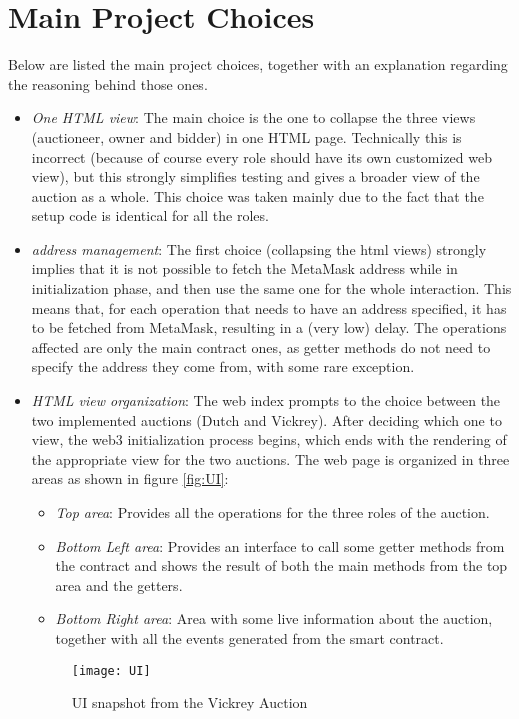\documentclass[11pt, a4paper]{report}
\begin{document}
\section*{Main Project Choices}
Below are listed the main project choices, together with an explanation regarding the reasoning behind those ones.
\begin{itemize}
	\item \emph{One HTML view}: The main choice is the one to collapse the three views (auctioneer, owner and bidder) in one HTML page. Technically this is incorrect (because of course every role should have its own customized web view), but this strongly simplifies testing and gives a broader view of the auction as a whole. This choice was taken mainly due to the fact that the setup code is identical for all the roles.
	\item \emph{address management}: The first choice (collapsing the html views) strongly implies that it is not possible to fetch the MetaMask address while in initialization phase, and then use the same one for the whole interaction. This means that, for each operation that needs to have an address specified, it has to be fetched from MetaMask, resulting in a (very low) delay. The operations affected are only the main contract ones, as getter methods do not need to specify the address they come from, with some rare exception. 
	\item \emph{HTML view organization}: The web index prompts to the choice between the two implemented auctions (Dutch and Vickrey). After deciding which one to view, the web3 initialization process begins, which ends with the rendering of the appropriate view for the two auctions. The web page is organized in three areas as shown in figure \ref{fig:UI}:
	\begin{itemize}
		\item \emph{Top area}: Provides all the operations for the three roles of the auction.
		\item \emph{Bottom Left area}: Provides an interface to call some getter methods from the contract and shows the result of both the main methods from the top area and the getters.
		\item \emph{Bottom Right area}: Area with some live information about the auction, together with all the events generated from the smart contract.
	\end{itemize}
	\begin{figure}
		\centering
		\texttt{[image: UI]}
		\caption{UI snapshot from the Vickrey Auction}

\end{figure}
\end{itemize}
\end{document}
